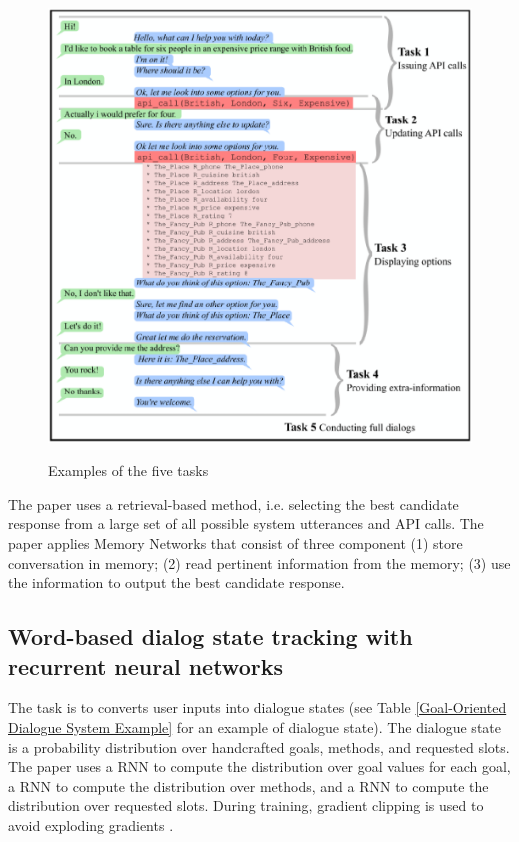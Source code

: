 \documentclass[paper=a4, fontsize=18pt]{article} %
\numberwithin{equation}{section} %
\numberwithin{figure}{section} %
\numberwithin{table}{section} %
\begin{document}
\begin{figure}[htbp]
  \centering
  \includegraphics[width=.8\linewidth]{Bordes2016Learning01}\\
  \caption{Examples of the five tasks}\label{fig:Bordes2016Learning01}
\end{figure}

The paper uses a retrieval-based method, i.e. selecting the best candidate response from a large set of all possible system utterances and API calls. The paper applies Memory Networks that consist of three component (1) store conversation in memory; (2) read pertinent information from the memory; (3) use the information to output the best candidate response.

\subsection{Word-based dialog state tracking with recurrent neural networks \cite{Henderson2014Word}}

The task is to converts user inputs into dialogue states (see Table \ref{Goal-Oriented Dialogue System Example} for an example of dialogue state). The dialogue state is a probability distribution over handcrafted goals, methods, and requested slots. The paper uses a RNN to compute the distribution over goal values for each goal, a RNN to compute the distribution over methods, and a RNN to compute the distribution over requested slots. During training, gradient clipping is used to avoid exploding gradients \cite{Pascanu2012Understanding}.
\end{document}
